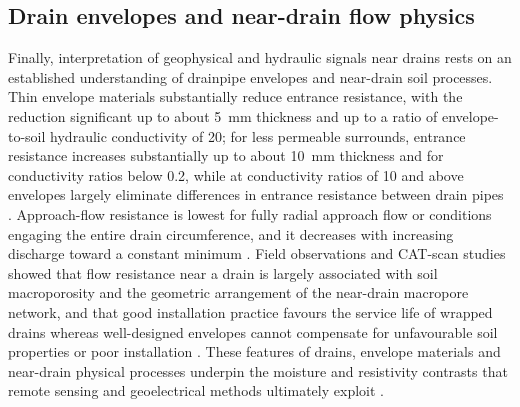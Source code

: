 \subsection{Drain envelopes and near-drain flow physics}

Finally, interpretation of geophysical and hydraulic signals near drains rests on an established understanding of drainpipe envelopes and near-drain soil processes. Thin envelope materials substantially reduce entrance resistance, with the reduction significant up to about 5~mm thickness and up to a ratio of envelope-to-soil hydraulic conductivity of 20; for less permeable surrounds, entrance resistance increases substantially up to about 10~mm thickness and for conductivity ratios below 0.2, while at conductivity ratios of 10 and above envelopes largely eliminate differences in entrance resistance between drain pipes \parencite{Stuyt2006}. Approach-flow resistance is lowest for fully radial approach flow or conditions engaging the entire drain circumference, and it decreases with increasing discharge toward a constant minimum \parencite{Stuyt2006}. Field observations and CAT-scan studies showed that flow resistance near a drain is largely associated with soil macroporosity and the geometric arrangement of the near-drain macropore network, and that good installation practice favours the service life of wrapped drains whereas well-designed envelopes cannot compensate for unfavourable soil properties or poor installation \parencite{Stuyt2006}. These features of drains, envelope materials and near-drain physical processes underpin the moisture and resistivity contrasts that remote sensing and geoelectrical methods ultimately exploit \parencite{Stuyt2006}.